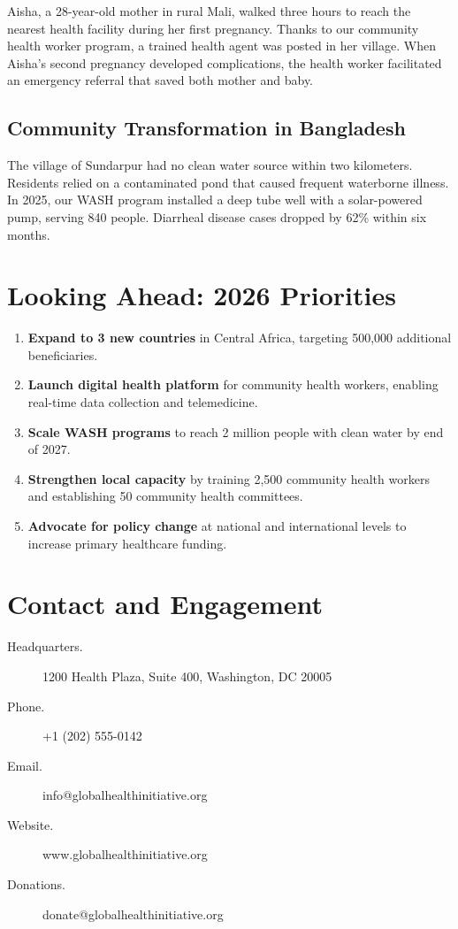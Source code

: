 \documentclass[
    language=english,
    doctype=impact-report,
    institution=none,
]{../../omnilatex}
\begin{document}
Aisha, a 28-year-old mother in rural Mali, walked three hours to reach the
nearest health facility during her first pregnancy. Thanks to our community
health worker program, a trained health agent was posted in her village.
When Aisha's second pregnancy developed complications, the health worker
facilitated an emergency referral that saved both mother and baby.

\subsection{Community Transformation in Bangladesh}

The village of Sundarpur had no clean water source within two kilometers.
Residents relied on a contaminated pond that caused frequent waterborne
illness. In 2025, our WASH program installed a deep tube well with a solar-powered
pump, serving 840 people. Diarrheal disease cases dropped by 62\% within
six months.

\section{Looking Ahead: 2026 Priorities}

\begin{enumerate}
    \item \textbf{Expand to 3 new countries} in Central Africa, targeting
          500,000 additional beneficiaries.
    \item \textbf{Launch digital health platform} for community health
          workers, enabling real-time data collection and telemedicine.
    \item \textbf{Scale WASH programs} to reach 2 million people with clean
          water by end of 2027.
    \item \textbf{Strengthen local capacity} by training 2,500 community
          health workers and establishing 50 community health committees.
    \item \textbf{Advocate for policy change} at national and international
          levels to increase primary healthcare funding.
\end{enumerate}

\section{Contact and Engagement}

\begin{description}
    \item[Headquarters.] 1200 Health Plaza, Suite 400, Washington, DC 20005
    \item[Phone.] +1 (202) 555-0142
    \item[Email.] info@globalhealthinitiative.org
    \item[Website.] www.globalhealthinitiative.org
    \item[Donations.] donate@globalhealthinitiative.org
\end{description}
\end{document}
